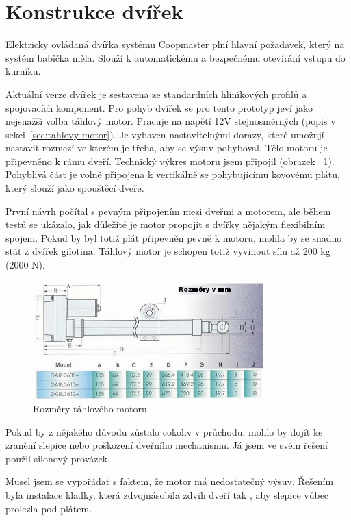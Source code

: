 \section{Konstrukce dvířek}\label{sec:konstrukce-dvirek}
Elektricky ovládaná dvířka systému Coopmaster plní hlavní požadavek, který na systém babička měla.
Slouží k automatickému a bezpečnému otevírání vstupu do kurníku.

Aktuální verze dvířek je sestavena ze standardních hliníkových profilů a spojovacích komponent.
Pro pohyb dvířek se pro tento prototyp jeví jako nejsnažší volba táhlový motor.
Pracuje na napětí 12V stejnosměrných (popis v sekci~\ref{sec:tahlovy-motor}).
Je vybaven nastavitelnými dorazy, které umožují nastavit rozmezí ve kterém je třeba, aby se výsuv pohyboval.
Tělo motoru je připevněno k rámu dveří.
Technický výkres motoru jsem připojil (obrazek ~\ref{fig:instalace_dvere_tahlovy_motor}).
Pohyblivá část je volně připojena k vertikálně se pohybujícímu kovovému plátu, který slouží jako spouštěcí dveře.

První návrh počítal s pevným připojením mezi dveřmi a motorem, ale během testů se ukázalo, jak důležité je motor propojit s dvířky nějakým flexibilním spojem.
Pokud by byl totiž plát připevněn pevně k motoru, mohla by se snadno stát z dvířek gilotina.
Táhlový motor je schopen totiž vyvinout sílu až 200 kg (2000 N).

\begin{figure}[h]
    \centering
    \includegraphics[width=0.8\textwidth]{img/instalace_dvere_tahlovy_motor}
    \caption{Rozměry táhlového motoru}
    \label{fig:instalace_dvere_tahlovy_motor}
\end{figure}

Pokud by z nějakého důvodu zůstalo cokoliv v průchodu, mohlo by dojít ke zranění slepice nebo poškození dveřního mechanismu.
Já jsem ve svém řešení použil silonový provázek.

Musel jsem se vypořádat s faktem, že motor má nedostatečný výsuv.
Řešením byla instalace kladky, která zdvojnásobila zdvih dveří tak , aby slepice vůbec prolezla pod plátem.

